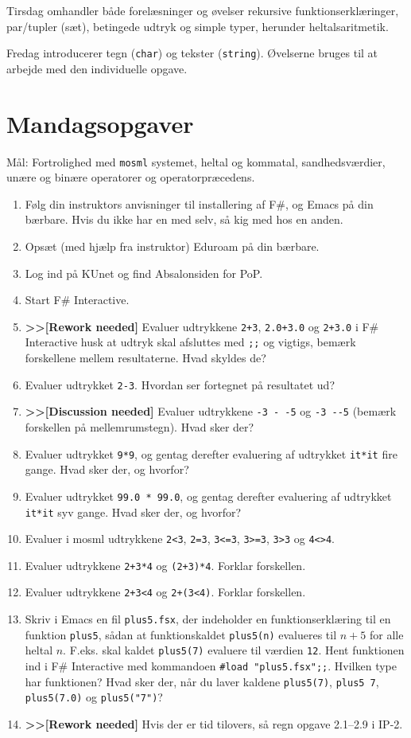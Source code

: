 \documentclass[a4paper,12pt]{article}
\begin{document}
Tirsdag omhandler både forelæsninger og øvelser rekursive
funktionserklæringer, par/tupler (sæt), betingede udtryk og simple
typer, herunder heltalsaritmetik.

Fredag introducerer tegn (\texttt{char}) og tekster
(\texttt{string}). Øvelserne bruges til at arbejde med den
individuelle opgave.


\section{Mandagsopgaver}
\label{sec:mandagsopgaver}

Mål: Fortrolighed med \texttt{mosml} systemet, heltal og kommatal,
sandhedsværdier, unære og binære operatorer og operatorpræcedens.

\begin{enumerate}[{1}M1]
\item Følg din instruktors anvisninger til installering af
  F\#, og Emacs på din bærbare. Hvis du ikke har en med selv, så kig
  med hos en anden.
\item Opsæt (med hjælp fra instruktor) Eduroam på din bærbare.
\item Log ind på KUnet og find Absalonsiden for PoP.
\item Start F\# Interactive.
\item \textbf{>>[Rework needed]} Evaluer udtrykkene \verb|2+3|, \verb|2.0+3.0| og \verb|2+3.0| i F\# Interactive husk at udtryk skal afsluttes med \verb|;;| og vigtigs, bemærk forskellene mellem resultaterne. Hvad skyldes de?
\item Evaluer udtrykket \verb|2-3|. Hvordan ser fortegnet på resultatet
  ud?
\item \textbf{>>[Discussion needed]} Evaluer udtrykkene \verb|-3 - -5| og \verb|-3 --5| (bemærk forskellen på
  mellemrumstegn). Hvad sker der?
\item Evaluer udtrykket \verb|9*9|, og gentag derefter evaluering af
  udtrykket \verb|it*it| fire gange. Hvad sker der, og hvorfor?
\item Evaluer udtrykket \verb|99.0 * 99.0|, og gentag derefter
  evaluering af udtrykket \verb|it*it| syv gange. Hvad sker der, og hvorfor?
\item Evaluer i mosml udtrykkene \verb|2<3|, \verb|2=3|, \verb|3<=3|, \verb|3>=3|, \verb|3>3| og \verb|4<>4|.
\item Evaluer udtrykkene \verb|2+3*4| og \verb|(2+3)*4|.  Forklar forskellen.
\item Evaluer udtrykkene \verb|2+3<4| og \verb|2+(3<4)|.  Forklar forskellen.
\item Skriv i Emacs en fil \texttt{plus5.fsx}, der indeholder en
  funktionserklæring til en funktion \verb|plus5|, sådan at funktionskaldet
  \verb|plus5(n)| evalueres til $n + 5$ for alle heltal $n$. F.eks. skal kaldet
  \verb|plus5(7)| evaluere til værdien \verb|12|. Hent funktionen ind i F\# Interactive med
  kommandoen \verb|#load "plus5.fsx";;|. Hvilken type har funktionen? Hvad
  sker der, når du laver kaldene \verb|plus5(7)|, \verb|plus5 7|, \verb|plus5(7.0)| og
  \verb|plus5("7")|?
\item \textbf{>>[Rework needed]} Hvis der er tid tilovers, så regn opgave 2.1--2.9 i IP-2.
\end{enumerate}
\end{document}
